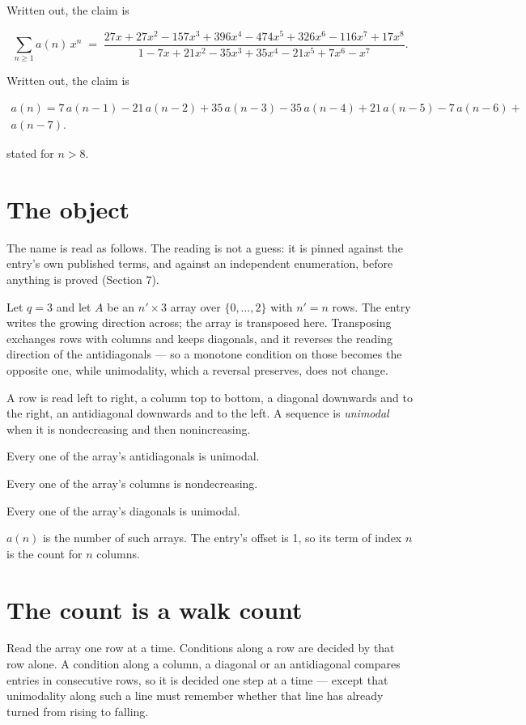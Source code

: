 \documentclass[11pt]{article}
\theoremstyle{definition}
\begin{document}
Written out, the claim is

\[\sum_{n \ge 1} a(n)\,x^n \;=\; \frac{27x + 27x^{2} - 157x^{3} + 396x^{4} - 474x^{5} + 326x^{6} - 116x^{7} + 17x^{8}}{1 - 7x + 21x^{2} - 35x^{3} + 35x^{4} - 21x^{5} + 7x^{6} - x^{7}}.\]

Written out, the claim is

\begin{multline*} a(n) = 7\,a(n-1) - 21\,a(n-2) + 35\,a(n-3) - 35\,a(n-4) + 21\,a(n-5) - 7\,a(n-6) + \\ a(n-7). \end{multline*}

stated for $n > 8$.

\section{The object}

The name is read as follows. The reading is not a guess: it is pinned against the entry's own published terms, and against an independent enumeration, before anything is proved (Section 7).

Let $q = 3$ and let $A$ be an $n' \times 3$ array over $\{0,\dots,2\}$ with $n' = n$ rows. The entry writes the growing direction across; the array is transposed here. Transposing exchanges rows with columns and keeps diagonals, and it reverses the reading direction of the antidiagonals --- so a monotone condition on those becomes the opposite one, while unimodality, which a reversal preserves, does not change.

A row is read left to right, a column top to bottom, a diagonal downwards and to the right, an antidiagonal downwards and to the left. A sequence is {\itshape unimodal} when it is nondecreasing and then nonincreasing.

Every one of the array's antidiagonals is unimodal.

Every one of the array's columns is nondecreasing.

Every one of the array's diagonals is unimodal.

$a(n)$ is the number of such arrays. The entry's offset is 1, so its term of index $n$ is the count for $n$ columns.

\section{The count is a walk count}

Read the array one row at a time. Conditions along a row are decided by that row alone. A condition along a column, a diagonal or an antidiagonal compares entries in consecutive rows, so it is decided one step at a time --- except that unimodality along such a line must remember whether that line has already turned from rising to falling.
\end{document}
